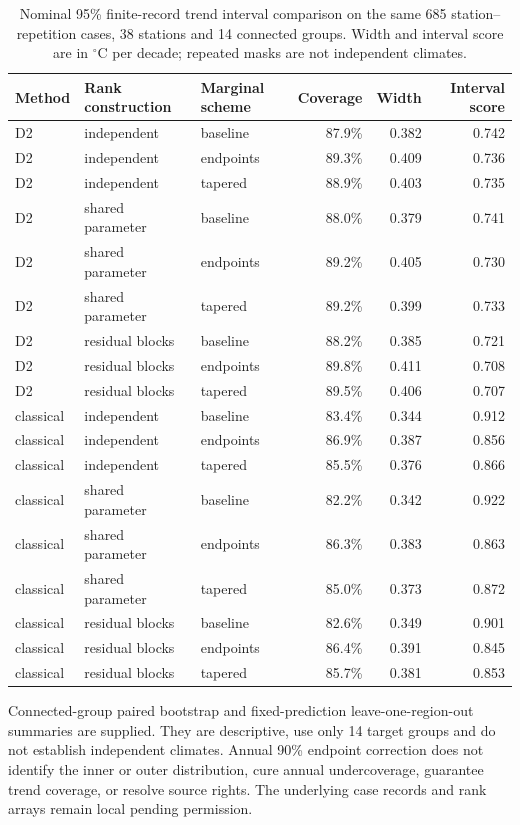 \begin{table}[p]\centering\footnotesize
\caption{Nominal 95\% finite-record trend interval comparison on the same 685 station--repetition cases, 38 stations and 14 connected groups. Width and interval score are in $^{\circ}$C per decade; repeated masks are not independent climates.}\label{tab:single-year-trend}
\begin{tabular}{lllrrr}\toprule
Method & Rank construction & Marginal scheme & Coverage & Width & Interval score\\\midrule
D2 & independent & baseline & 87.9\% & 0.382 & 0.742\\
D2 & independent & endpoints & 89.3\% & 0.409 & 0.736\\
D2 & independent & tapered & 88.9\% & 0.403 & 0.735\\
D2 & shared parameter & baseline & 88.0\% & 0.379 & 0.741\\
D2 & shared parameter & endpoints & 89.2\% & 0.405 & 0.730\\
D2 & shared parameter & tapered & 89.2\% & 0.399 & 0.733\\
D2 & residual blocks & baseline & 88.2\% & 0.385 & 0.721\\
D2 & residual blocks & endpoints & 89.8\% & 0.411 & 0.708\\
D2 & residual blocks & tapered & 89.5\% & 0.406 & 0.707\\
classical & independent & baseline & 83.4\% & 0.344 & 0.912\\
classical & independent & endpoints & 86.9\% & 0.387 & 0.856\\
classical & independent & tapered & 85.5\% & 0.376 & 0.866\\
classical & shared parameter & baseline & 82.2\% & 0.342 & 0.922\\
classical & shared parameter & endpoints & 86.3\% & 0.383 & 0.863\\
classical & shared parameter & tapered & 85.0\% & 0.373 & 0.872\\
classical & residual blocks & baseline & 82.6\% & 0.349 & 0.901\\
classical & residual blocks & endpoints & 86.4\% & 0.391 & 0.845\\
classical & residual blocks & tapered & 85.7\% & 0.381 & 0.853\\
\bottomrule\end{tabular}
\end{table}
Connected-group paired bootstrap and fixed-prediction leave-one-region-out summaries are supplied. They are descriptive, use only 14 target groups and do not establish independent climates. Annual 90\% endpoint correction does not identify the inner or outer distribution, cure annual undercoverage, guarantee trend coverage, or resolve source rights. The underlying case records and rank arrays remain local pending permission.
